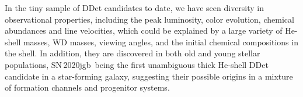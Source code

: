 \documentclass[twocolumn]{aastex631}
\newcommand{\sn}{SN\,2020jgb}
\begin{document}
In the tiny sample of DDet candidates to date, we have seen diversity in observational properties, including the peak luminosity, color evolution, chemical abundances and line velocities, which could be explained by a large variety of He-shell masses, WD masses, viewing angles, and the initial chemical compositions in the shell. In addition, they are discovered in both old and young stellar populations, \sn\ being the first unambiguous thick He-shell DDet candidate in a star-forming galaxy, suggesting their possible origins in a mixture of formation channels and progenitor systems.

\begin{acknowledgements}
\end{acknowledgements}







\end{document}
